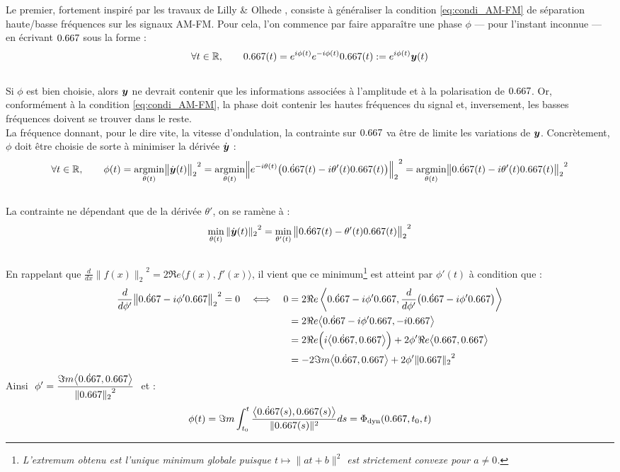 Le premier, fortement inspiré par les travaux de Lilly \& Olhede  \cite{lilly_analysis_2012}, consiste à généraliser la condition \eqref{eq:condi_AM-FM} de séparation haute/basse fréquences sur les signaux AM-FM.
Pour cela, l'on commence par faire apparaître une phase $\phi$ --- pour l'instant inconnue --- en écrivant $\x$ sous la forme :
\[\forall t\in\R,\qquad \x(t) = e^{i\phi(t)} e^{-i\phi(t)} \x(t) \defeq e^{i\phi(t)} \bf{y}(t)\]
\\
Si $\phi$ est bien choisie, alors $\bf{y}$ ne devrait contenir que les informations associées à l'amplitude et à la polarisation de $\x$. Or, conformément à la condition \eqref{eq:condi_AM-FM}, la phase doit contenir les hautes fréquences du signal et, inversement, les basses fréquences doivent se trouver dans le reste. 
\\
La fréquence donnant, pour le dire vite, la vitesse d'ondulation, la contrainte sur $\x$ va être de limite les variations de  $\bf{y}$. Concrètement, $\phi$ doit être choisie de sorte à minimiser la dérivée $\dot{\bf{y}}$ :
\[\forall t\in\R,\qquad \phi(t) = \argmin{\theta(t)}{\big\|\dot{\bf{y}}(t)\big\|_2}^2 = \argmin{\theta(t)}{\Big\|e^{-i\theta(t)}\big(\dot{\x}(t) - i\theta'(t) \x(t)\big) \Big\|_2}^2 = \argmin{\theta(t)}{\big\|\dot{\x}(t) - i\theta'(t)\x(t)\big\|_2}^2\]
\\
La contrainte ne dépendant que de la dérivée $\theta'$, on se ramène à :
\[\min_{\theta(t)}{\|\dot{\bf{y}}(t)\|_2}^2 = \min_{\theta'(t)}{\big\|\dot{\x}(t) - \theta'(t) \x(t)\big\|_2}^2\]
\\
En rappelant que $\frac{d}{dx}{\big\|f(x)\big\|_2}^2 = 2\Re e\big\langle f(x), f'(x)\big\rangle$, il vient que ce minimum\footnote{\itshape
	L'extremum obtenu est l'unique minimum globale puisque $t\longmapsto \|at + b\|^2$ est strictement convexe pour $a\neq0$.}
est atteint par $\phi'(t)$ à condition que :
\begin{align*}
	\frac{d}{d\phi'}{\big\| \dot{\x} - i\phi' \x\big\|_2}^2 = 0 \quad \Llr\quad
	0 &= 2\Re e\left\langle  \dot{\x} - i\phi' \x ,  \frac{d}{d\phi'}\big(\dot{\x} - i\phi' \x\big)\right\rangle \\
	&= 2\Re e\big\langle  \dot{\x} - i\phi' \x ,  - i \x\big\rangle \\
	&= 2\Re e\Big(i\big\langle  \dot{\x} ,  \x\big\rangle\Big) + 2\phi'\Re e\big\langle   \x ,  \x\big\rangle\\
	&= -2\Im m\big\langle  \dot{\x} ,  \x\big\rangle + 2\phi'{\| \x\|_2}^2
\end{align*}
Ainsi $\displaystyle \ \phi' = \frac{\Im m\big\langle  \dot{\x} ,  \x\big\rangle}{{\| \x\|_2}^2}\ $ et :
\begin{equation}\label{eq:phas_inst_v1}
  \phi(t) = \Im m\int_{t_0}^t \frac{\big\langle \dot{\x}(s) , \x(s) \big\rangle}{\|\x(s)\|^2} ds = \phased(\x,t_0,t)
\end{equation}
\skipl




